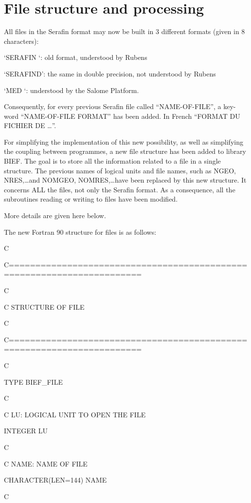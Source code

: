\section{File structure and processing}
\label{se:filestruct}
All files in the Serafin format may now be built in 3 different formats (given in 8 characters):

 `SERAFIN `: old format, understood by Rubens

 `SERAFIND': the same in double precision, not understood by Rubens

 `MED  `: understood by the Salome Platform.

 Consequently, for every previous Serafin file called ``NAME-OF-FILE'', a key-word ``NAME-OF-FILE FORMAT'' has been added. In French ``FORMAT DU FICHIER DE \dots ''.

 For simplifying the implementation of this new possibility, as well as simplifying the coupling between programmes, a new file structure has been added to library BIEF. The goal is to store all the information related to a file in a single structure. The previous names of logical units and file names, such as NGEO, NRES,\dots  and NOMGEO, NOMRES,\dots  have been replaced by this new structure. It concerns ALL the files, not only the Serafin format. As a consequence, all the subroutines reading or writing to files have been modified.

 More details are given here below.

 \textbf{}

 The new Fortran 90 structure for files is as follows:

 C

 C=======================================================================

 C

 C STRUCTURE OF FILE

 C

 C=======================================================================

 C

   TYPE BIEF\_FILE

 C

 C   LU: LOGICAL UNIT TO OPEN THE FILE

    INTEGER LU

 C

 C   NAME: NAME OF FILE

    CHARACTER(LEN=144) NAME

 C


